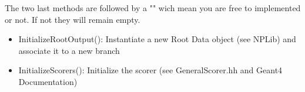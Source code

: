 \documentclass{book}
\begin{document}
	
The two last methods are followed by a "{}" wich mean you are free to implemented or not. If not they will remain empty.
	\begin{itemize}
		\item[] InitializeRootOutput(): Instantiate a new Root Data object (see NPLib) and associate it to a new branch
		\item[] InitializeScorers(): Initialize the scorer (see GeneralScorer.hh and Geant4 Documentation)
	\end{itemize}
\end{document}
